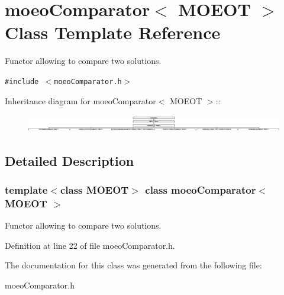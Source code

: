 \section{moeo\-Comparator$<$ MOEOT $>$ Class Template Reference}
\label{classmoeoComparator}
Functor allowing to compare two solutions.  


{\tt \#include $<$moeo\-Comparator.h$>$}

Inheritance diagram for moeo\-Comparator$<$ MOEOT $>$::\begin{figure}[H]
\begin{center}
\leavevmode
\includegraphics[height=0.752688cm]{classmoeoComparator}
\end{center}
\end{figure}


\subsection{Detailed Description}
\subsubsection*{template$<$class MOEOT$>$ class moeo\-Comparator$<$ MOEOT $>$}

Functor allowing to compare two solutions. 



Definition at line 22 of file moeo\-Comparator.h.

The documentation for this class was generated from the following file:\begin{CompactItemize}
\item 
moeo\-Comparator.h\end{CompactItemize}
